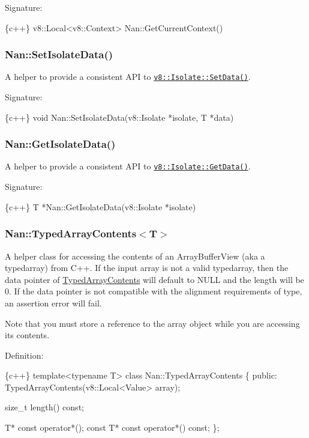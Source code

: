 Signature\+:


\begin{DoxyCode}
\{c++\}
v8::Local<v8::Context> Nan::GetCurrentContext()
\end{DoxyCode}


\label{_api_nan_set_isolate_data}%
 \subsubsection*{Nan\+::\+Set\+Isolate\+Data()}

A helper to provide a consistent A\+PI to \href{https://v8docs.nodesource.com/io.js-3.0/d5/dda/classv8_1_1_isolate.html#a7acadfe7965997e9c386a05f098fbe36}{\tt {\ttfamily v8\+::\+Isolate\+::\+Set\+Data()}}.

Signature\+:


\begin{DoxyCode}
\{c++\}
void Nan::SetIsolateData(v8::Isolate *isolate, T *data)
\end{DoxyCode}


\label{_api_nan_get_isolate_data}%
 \subsubsection*{Nan\+::\+Get\+Isolate\+Data()}

A helper to provide a consistent A\+PI to \href{https://v8docs.nodesource.com/io.js-3.0/d5/dda/classv8_1_1_isolate.html#aabd223436bc1100a787dadaa024c6257}{\tt {\ttfamily v8\+::\+Isolate\+::\+Get\+Data()}}.

Signature\+:


\begin{DoxyCode}
\{c++\}
T *Nan::GetIsolateData(v8::Isolate *isolate)
\end{DoxyCode}


\label{_api_nan_typedarray_contents}%
 \subsubsection*{Nan\+::\+Typed\+Array\+Contents$<$\+T$>$}

A helper class for accessing the contents of an Array\+Buffer\+View (aka a typedarray) from C++. If the input array is not a valid typedarray, then the data pointer of \hyperlink{class_typed_array_contents}{Typed\+Array\+Contents} will default to {\ttfamily N\+U\+LL} and the length will be 0. If the data pointer is not compatible with the alignment requirements of type, an assertion error will fail.

Note that you must store a reference to the {\ttfamily array} object while you are accessing its contents.

Definition\+:


\begin{DoxyCode}
\{c++\}
template<typename T>
class Nan::TypedArrayContents \{
 public:
  TypedArrayContents(v8::Local<Value> array);

  size\_t length() const;

  T* const operator*();
  const T* const operator*() const;
\};
\end{DoxyCode}
 